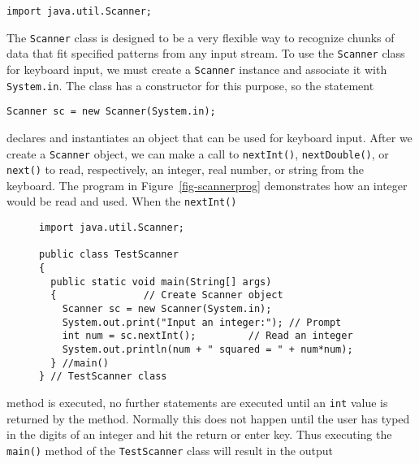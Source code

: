 \begin{jjjlisting}
\begin{lstlisting}
import java.util.Scanner;
\end{lstlisting}
\end{jjjlisting}

\noindent The {\tt Scanner} class is designed to be a very flexible way to
recognize chunks of data that fit specified patterns from any input
stream.  To use the {\tt Scanner} class for keyboard input, we must
create a {\tt Scanner} instance and associate it with {\tt System.in}.
The class has a constructor for this purpose, so the statement

\begin{jjjlisting}
\begin{lstlisting}
Scanner sc = new Scanner(System.in);
\end{lstlisting}
\end{jjjlisting}

\noindent declares and instantiates an  object that can be used for keyboard input.
After we create a {\tt Scanner} object, we can make a call to {\tt nextInt()},
{\tt nextDouble()}, or {\tt next()} to read, respectively, an integer, real 
number, or string from the keyboard.  The program in Figure~\ref{fig-scannerprog}
demonstrates how an integer would be read and used. When the {\tt nextInt()}
\begin{figure}[htb]
\jjjprogstart
\begin{jjjlisting}
\begin{lstlisting}
import java.util.Scanner;

public class TestScanner 
{
  public static void main(String[] args) 
  {               // Create Scanner object
    Scanner sc = new Scanner(System.in); 
    System.out.print("Input an integer:"); // Prompt
    int num = sc.nextInt();         // Read an integer
    System.out.println(num + " squared = " + num*num);
  } //main()
} // TestScanner class
\end{lstlisting}
\end{jjjlisting}
\end{figure}
method is executed, no further statements are executed until an {\tt int} value
is returned by the method.  Normally this does not happen until the
user has typed in the digits of an integer and hit the return or enter key.
Thus executing the {\tt main()} method of the {\tt TestScanner}  class will 
result in the output 


